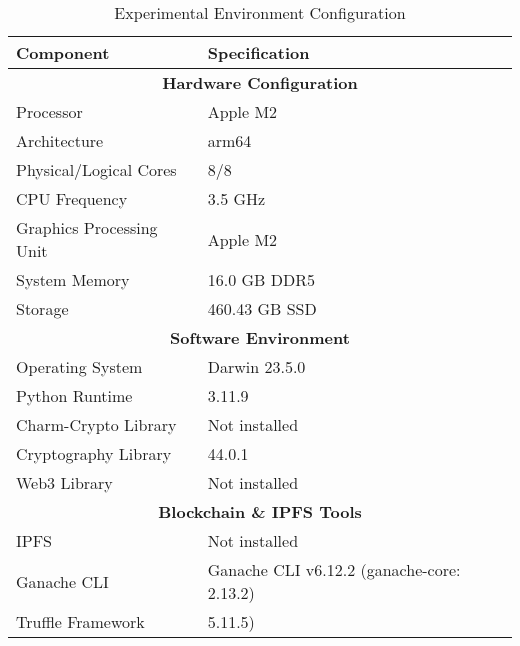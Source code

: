 
\begin{table}[htbp]
\centering
\caption{Experimental Environment Configuration}
\label{tab:experimental_config}
\begin{tabular}{|l|l|}
\hline
\textbf{Component} & \textbf{Specification} \\
\hline
\multicolumn{2}{|c|}{\textbf{Hardware Configuration}} \\
\hline
Processor & Apple M2 \\
Architecture & arm64 \\
Physical/Logical Cores & 8/8 \\
CPU Frequency & 3.5 GHz \\
Graphics Processing Unit & Apple M2 \\
System Memory & 16.0 GB DDR5 \\
Storage & 460.43 GB SSD \\
\hline
\multicolumn{2}{|c|}{\textbf{Software Environment}} \\
\hline
Operating System & Darwin 23.5.0 \\
Python Runtime & 3.11.9 \\
Charm-Crypto Library & Not installed \\
Cryptography Library & 44.0.1 \\
Web3 Library & Not installed \\
\hline
\multicolumn{2}{|c|}{\textbf{Blockchain \& IPFS Tools}} \\
\hline
IPFS & Not installed \\
Ganache CLI & Ganache CLI v6.12.2 (ganache-core: 2.13.2) \\
Truffle Framework & 5.11.5) \\
\hline
\end{tabular}
\end{table}

